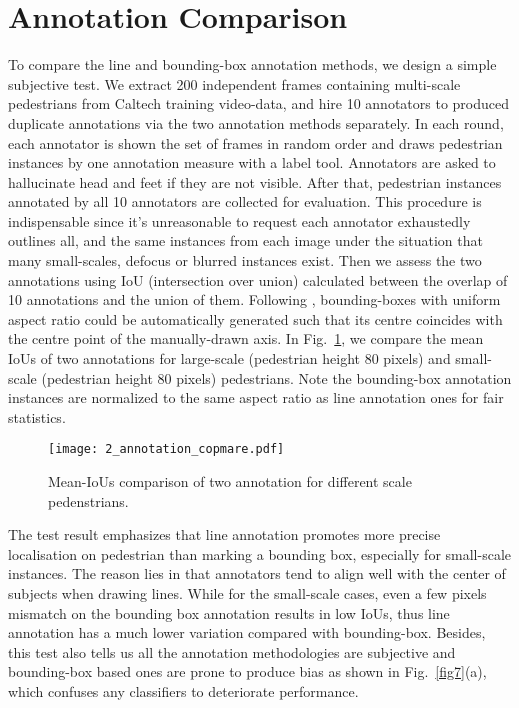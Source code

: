 \documentclass[runningheads]{llncs}
\begin{document}
\section{Annotation Comparison}\label{sec:anno_com}
To compare the line and bounding-box annotation methods, we design a simple subjective test. We extract 200 independent frames containing multi-scale pedestrians from Caltech training video-data, and hire 10 annotators to produced duplicate annotations via the two annotation methods separately. In each round, each annotator is shown the set of frames in random order and draws pedestrian instances by one annotation measure with a label tool. Annotators are asked to hallucinate head and feet if they are not visible. After that, pedestrian instances annotated by all 10 annotators are collected for evaluation. This procedure is indispensable since it's unreasonable to request each annotator exhaustedly outlines all, and the same instances from each image under the situation that many small-scales, defocus or blurred instances exist. Then we assess the two annotations using IoU (intersection over union) calculated between the overlap of 10 annotations and the union of them. Following \cite{NewCal}, bounding-boxes with uniform aspect ratio could be automatically generated such that its centre coincides with the centre point of the manually-drawn axis. In Fig.~\ref{fig2}, we compare the mean IoUs of two annotations for large-scale (pedestrian height  80 pixels) and small-scale (pedestrian height  80 pixels) pedestrians. Note the bounding-box annotation instances are normalized to the same aspect ratio as line annotation ones for fair statistics.
\begin{figure}[t]
	\centering
	\texttt{[image: 2\_annotation\_copmare.pdf]}
	\caption{Mean-IoUs comparison of two annotation for different scale pedenstrians.}
	\label{fig2}
\end{figure}

The test result emphasizes that line annotation promotes more precise localisation on pedestrian than marking a bounding box, especially for small-scale instances. The reason lies in that annotators tend to align well with the center of subjects when drawing lines. While for the small-scale cases, even a few pixels mismatch on the bounding box annotation results in low IoUs, thus line annotation has a much lower variation compared with bounding-box. Besides, this test also tells us all the annotation methodologies are subjective and bounding-box based ones are prone to produce bias as shown in Fig.~\ref{fig7}(a), which confuses any classifiers to deteriorate performance.
\end{document}
